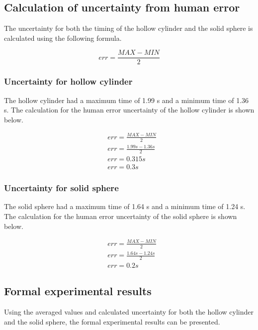 \documentclass[letterpaper, 12pt]{article}
\begin{document}
\subsection{Calculation of uncertainty from human error}

The uncertainty for both the timing of the hollow cylinder and
the solid sphere is calculated using the following formula.

$$
    err = \frac{MAX - MIN}{2}
$$

\subsubsection{Uncertainty for hollow cylinder}

The hollow cylinder had a maximum time of 1.99 \unit{s} and a minimum
time of 1.36 \unit{s}. The calculation for the human error uncertainty of the hollow cylinder is
shown below.

\begin{align*}
     & err = \frac{MAX - MIN}{2}
    \\
     & err = \frac{1.99 \unit{s} - 1.36 \unit{s}}{2}
    \\
     & err = 0.315 \unit{s}
    \\
     & err = 0.3 \unit{s}
\end{align*}

\subsubsection{Uncertainty for solid sphere}

The solid sphere had a maximum time of 1.64 \unit{s} and a minimum time of 1.24 \unit{s}.
The calculation for the human error uncertainty of the solid sphere is shown below.

\begin{align*}
     & err = \frac{MAX - MIN}{2}
    \\
     & err = \frac{1.64\unit{s} - 1.24\unit{s}}{2}
    \\
     & err = 0.2\unit{s}
\end{align*}

\subsection{Formal experimental results}

Using the averaged values and calculated uncertainty for both the
hollow cylinder and the solid sphere, the formal experimental results
can be presented.
\end{document}
